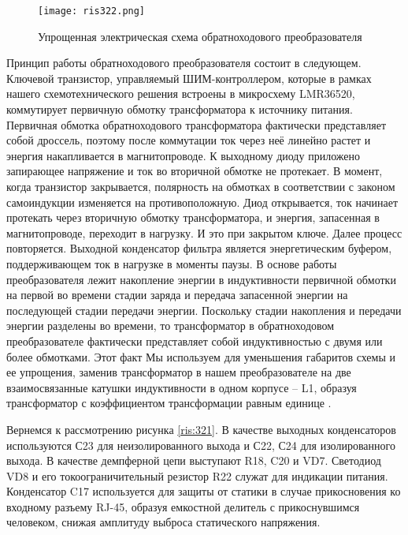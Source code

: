 \begin{figure}[H]
    \centering
    \texttt{[image: ris322.png]}
    \caption{Упрощенная электрическая схема обратноходового преобразователя}
    \label{ris:322}
\end{figure}

Принцип работы обратноходового преобразователя состоит в следующем. Ключевой транзистор, 
управляемый ШИМ-контроллером, которые в рамках нашего схемотехнического решения встроены
в микросхему LMR36520, коммутирует первичную обмотку трансформатора к источнику питания.
Первичная обмотка обратноходового трансформатора фактически представляет собой дроссель, 
поэтому после коммутации ток через неё линейно растет и энергия накапливается в магнитопроводе. 
К выходному диоду приложено запирающее напряжение и ток во вторичной обмотке не протекает. 
В момент, когда транзистор закрывается, полярность на обмотках в соответствии с законом 
самоиндукции изменяется на противоположную. Диод открывается, ток начинает протекать через
вторичную обмотку трансформатора, и энергия, запасенная в магнитопроводе, переходит в нагрузку. 
И это при закрытом ключе. Далее процесс повторяется. Выходной конденсатор фильтра является 
энергетическим буфером, поддерживающем ток в нагрузке в моменты паузы.
В основе работы преобразователя лежит накопление энергии в индуктивности первичной обмотки 
на первой во времени стадии заряда и передача запасенной энергии на последующей стадии 
передачи энергии. Поскольку стадии накопления и передачи энергии разделены во времени, 
то трансформатор в обратноходовом преобразователе фактически представляет собой индуктивностью 
с двумя или более обмотками. Этот факт Мы используем для уменьшения габаритов схемы и ее упрощения,
заменив трансформатор в нашем преобразователе на две взаимосвязанные катушки индуктивности в 
одном корпусе -- L1, образуя трансформатор с коэффициентом трансформации равным единице
\cite{PowerElectronic:FlyBack} 
\cite{Würth Elektronik:Application Note}
\cite{DC-DC_Book:Recom}.

Вернемся к рассмотрению рисунка \ref{ris:321}. В качестве выходных конденсаторов используются
С23 для неизолированного выхода и С22, С24 для изолированного выхода. В качестве демпферной цепи 
выступают R18, C20 и VD7. Светодиод VD8 и его токоограничительный резистор R22 служат для 
индикации питания. Конденсатор C17 используется для защиты от статики в случае прикосновения ко 
входному разъему RJ-45, образуя емкостной делитель с прикоснувшимся человеком, снижая амплитуду 
выброса статического напряжения. 

